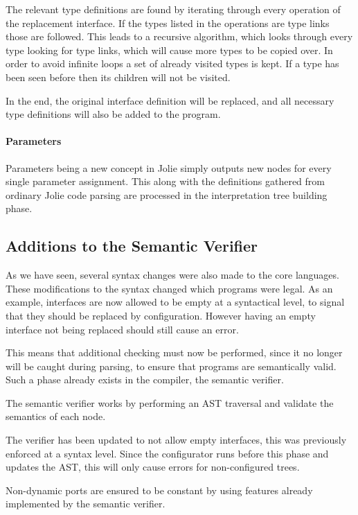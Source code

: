 The relevant type definitions are found by iterating through every operation of
the replacement interface. If the types listed in the operations are type links
those are followed. This leads to a recursive algorithm, which looks through
every type looking for type links, which will cause more types to be copied
over. In order to avoid infinite loops a set of already visited types is kept.
If a type has been seen before then its children will not be visited.

In the end, the original interface definition will be replaced, and all
necessary type definitions will also be added to the program.

\paragraph{Parameters}

Parameters being a new concept in Jolie simply outputs new nodes for every
single parameter assignment. This along with the definitions gathered from
ordinary Jolie code parsing are processed in the interpretation tree building
phase.

\subsection{Additions to the Semantic Verifier}

As we have seen, several syntax changes were also made to the core languages.
These modifications to the syntax changed which programs were
legal. As an example, interfaces are now allowed to be empty at a syntactical
level, to signal that they should be replaced by configuration. However having
an empty interface not being replaced should still cause an error.

This means that additional checking must now be performed, since it no longer
will be caught during parsing, to ensure that programs are semantically valid.
Such a phase already exists in the compiler, the semantic verifier.

The semantic verifier works by performing an AST traversal and validate the
semantics of each node.

The verifier has been updated to not allow empty interfaces, this was
previously enforced at a syntax level. Since the configurator runs before this
phase and updates the AST, this will only cause errors for non-configured
trees.

Non-dynamic ports are ensured to be constant by using features already
implemented by the semantic verifier.

